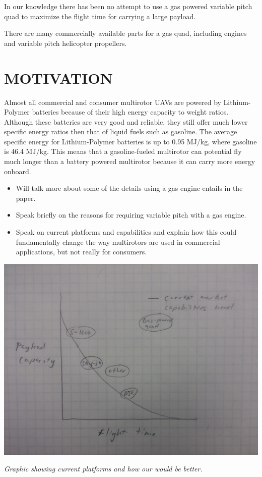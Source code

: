 \documentclass[letterpaper, 10 pt, conference]{ieeeconf}  %
\makeatletter
\newenvironment{figurehere}
  {\def\@captype{figure}}
  {}
\makeatother
\begin{document}
In our knowledge there has been no attempt to use a gas powered variable pitch quad to maximize the flight time for carrying a large payload. 

There are many commercially available parts for a gas quad, including engines and variable pitch helicopter propellers. 

\section{MOTIVATION}

Almost all commercial and consumer multirotor UAVs are powered by Lithium-Polymer batteries because of their high energy capacity to weight ratios. Although these batteries are very good and reliable, they still offer much lower specific energy ratios then that of liquid fuels such as gasoline. The average specific energy for Lithium-Polymer batteries is up to 0.95 MJ/kg, where gasoline is 46.4 MJ/kg. This means that a gasoline-fueled multirotor can potential fly much longer than a battery powered multirotor because it can carry more energy onboard. 

\begin{itemize}
	\item{Will talk more about some of the details using a gas engine entails in the paper.}
	\item{Speak briefly on the reasons for requiring variable pitch with a gas engine.} 
	\item{Speak on current platforms and capabilities and explain how this could fundamentally change the way multirotors are used in commercial applications, but not really for consumers.}
\end{itemize}


\begin{figurehere}
	\begin{center}
		\includegraphics[width=.40\textwidth]{current_capabilities.jpg}
		\caption{\textit{Graphic showing current platforms and how our would be better.}}
		\label{current_cap}
	\end{center}
\end{figurehere}
\end{document}
